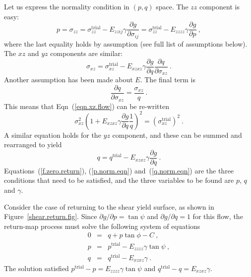 \documentclass[]{scrreprt}
\begin{document}
Let us express the normality condition in $(p, q)$ space.  The $zz$
component is easy:
\begin{equation}
p = \sigma_{zz} = \sigma_{zz}^{\mathrm{trial}} - E_{zzij}\gamma
\frac{\partial g}{\partial \sigma_{ij}} = \sigma_{zz}^{\mathrm{trial}} - E_{zzzz}\gamma
\frac{\partial g}{\partial p}  \ ,
\label{p.norm.eqn}
\end{equation}
where the last equality holds by assumption (see full list of
assumptions below).  The $xz$ and $yz$ components are similar:
\begin{equation}
\sigma_{xz} = \sigma_{xz}^{\mathrm{trial}} - E_{xzxz}\gamma
\frac{\partial g}{\partial q}\frac{\partial q}{\partial \sigma_{xz}}
\ . \label{eqn.xz.flow}
\end{equation}
Another assumption has been made about $E$.  The final term is
\begin{equation}
\frac{\partial q}{\partial\sigma_{xz}} = \frac{\sigma_{xz}}{q} \ .
\end{equation}
This means that Eqn~(\ref{eqn.xz.flow}) can be re-written
\begin{equation}
\sigma_{xz}^{2} \left( 1 + E_{xzxz}\gamma \frac{\partial g}{\partial
  q} \frac{1}{q} \right)^{2} =
\left(\sigma^{\mathrm{trial}}_{xz}\right)^{2} \ .
\end{equation}
A similar equation holds for the $yz$ component, and these can be
summed and rearranged to yield
\begin{equation}
q = q^{\mathrm{trial}} - E_{xzxz}\gamma \frac{\partial g}{\partial q}
\ . \label{q.norm.eqn}
\end{equation}
Equations~(\ref{f.zero.return}), (\ref{p.norm.eqn})
and~(\ref{q.norm.eqn}) are the three conditions that need to be
satisfied, and the three variables to be found are $p$, $q$ and
$\gamma$.

Consider the case of returning to the shear yield surface, as shown in
Figure~\ref{shear.return.fig}.  Since $\partial g/\partial p =
\tan\psi$ and $\partial g/\partial q = 1$ for this flow, the
return-map process must solve the following system of equations
\begin{eqnarray}
0 & = & q + p\tan\phi - C \ , \\
p & = & p^{\mathrm{trial}} - E_{zzzz}\gamma\tan\psi \ , \\
q & = & q^{\mathrm{trial}} - E_{xzxz}\gamma \ .
\end{eqnarray}
The solution satisfied $p^{\mathrm{trial}} - p =
E_{zzzz}\gamma\tan\psi$ and $q^{\mathrm{trial}} - q = E_{xzxz}\gamma$.
\end{document}
